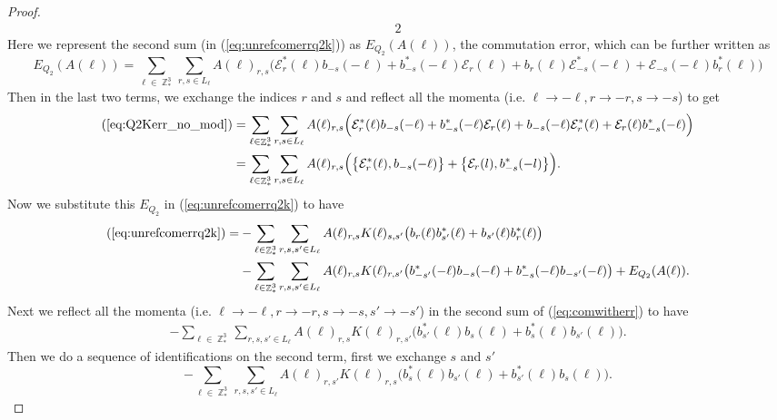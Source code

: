 \documentclass[sn-mathphys,Numbered, a4paper ,nocrop]{sn-jnl}%
\DeclareMathOperator{\Z}{\mathbb{Z}}
\theoremstyle{plain}
\theoremstyle{definition}
\theoremstyle{remark}
\theoremstyle{plain}
\theoremstyle{definition}
\theoremstyle{remark}
\begin{document}
\begin{proof}
\begin{alignat}{2}
\end{alignat}
Here we represent the second sum (in (\ref{eq:unrefcomerrq2k})) as $E_{Q_2}(A(\ell))$, the commutation error, which can be further written as
\begin{equation}
    E_{Q_2}(A(\ell)) = \sum\limits_{\ell \in \Z^3_*}\sum\limits_{r,s \in L_{\ell}}A(\ell)_{r,s}\Big( \mathcal{E}^*_{r}(\ell)b_{-s}(-\ell) +b^*_{-s}(-\ell) \mathcal{E}_{r}(\ell)+b_{r}(\ell) \mathcal{E}^*_{-s}(-\ell)+ \mathcal{E}_{-s}(-\ell)b^*_{r}(\ell) \Big)\label{eq:Q2Kerr_no_mod}
\end{equation}
Then in the last two terms, we exchange the indices $r$ and $s$ and reflect all the momenta (i.e. $\ell\rightarrow -\ell,r\rightarrow -r,s\rightarrow -s$) to get
\begin{align}
    (\ref{eq:Q2Kerr_no_mod})&=\sum\limits_{\ell \in \Z^3_*}\sum\limits_{r,s \in L_{\ell}}A(\ell)_{r,s}\Big( \mathcal{E}^*_{r}(\ell)b_{-s}(-\ell) +b^*_{-s}(-\ell) \mathcal{E}_{r}(\ell)+b_{-s}(-\ell) \mathcal{E}^*_{r}(\ell)+ \mathcal{E}_{r}(\ell)b^*_{-s}(-\ell) \Big)\\
    &=\sum\limits_{\ell \in \Z^3_*}\sum\limits_{r,s \in L_{\ell}}A(\ell)_{r,s}\Big(\big\{\mathcal{E}^*_{r}(\ell), b_{-s}(-\ell)\big\} + \big\{\mathcal{E}_r(l), b^*_{-s}(-l)\big\}\Big).
\end{align}
Now we substitute this $E_{Q_2} $ in (\ref{eq:unrefcomerrq2k}) to have
\begin{align}
    (\ref{eq:unrefcomerrq2k})=&-\sum\limits_{\ell \in \Z^3_*}\sum\limits_{r,s,s' \in L_{\ell}}A(\ell)_{r,s}
        K(\ell)_{s,s'}\big(b_{r}(\ell)b^*_{s'}(\ell)+b_{s'}(\ell)b^*_{r}(\ell) \big)\nonumber\\ &-\sum\limits_{\ell \in \Z^3_*}\sum\limits_{r,s,s' \in L_{\ell}}A(\ell)_{r,s} K(\ell)_{r,s'}\big(b^*_{-s'}(-\ell)b_{-s}(-\ell) + b^*_{-s}(-\ell)b_{-s'}(-\ell)\big) + E_{Q_2}(A(\ell)).\label{eq:comwitherr}
\end{align}
Next we reflect all the momenta (i.e. $\ell\rightarrow -\ell,r\rightarrow -r,s\rightarrow -s,s'\rightarrow -s'$) in the second sum of (\ref{eq:comwitherr}) to have
\begin{align}
   -\sum\limits_{\ell \in \Z^3_*}\sum\limits_{r,s,s' \in L_{\ell}}A(\ell)_{r,s} K(\ell)_{r,s'}\big(b^*_{s'}(\ell)b_{s}(\ell) + b^*_{s}(\ell)b_{s'}(\ell)\big).
\end{align}
Then we do a sequence of identifications on the second term, first we exchange $s$ and $s'$ 
\begin{equation}
   -\sum\limits_{\ell \in \Z^3_*}\sum\limits_{r,s,s' \in L_{\ell}}A(\ell)_{r,s'} K(\ell)_{r,s}\big(b^*_{s}(\ell)b_{s'}(\ell) + b^*_{s'}(\ell)b_{s}(\ell)\big).

\end{equation}
\end{proof}
\end{document}
